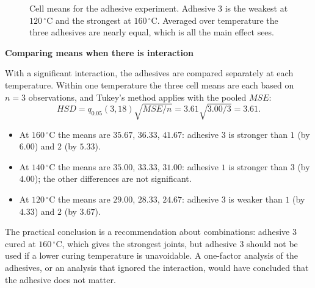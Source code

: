 \documentclass[11pt,a4paper]{article}
\numberwithin{equation}{section}
\theoremstyle{definition}
\newcommand{\subhead}[1]{%
  \par\medskip\noindent\textbf{#1}\par\nobreak\smallskip}
\begin{document}
\begin{figure}[H]
\centering
{}
\caption{Cell means for the adhesive experiment. Adhesive $3$ is the weakest at $120\,^\circ$C and the strongest at $160\,^\circ$C. Averaged over
temperature the three adhesives are nearly equal, which is all the main effect sees.}
\label{fig:adhesive}
\end{figure}

\subhead{Comparing means when there is interaction}
With a significant interaction, the adhesives are compared separately at each temperature. Within one temperature the three cell means are each
based on $n = 3$ observations, and Tukey's method applies with the pooled $MSE$:
\[
HSD = q_{0.05}(3, 18)\sqrt{MSE/n} = 3.61\sqrt{3.00/3} = 3.61 .
\]
\begin{itemize}
\item At $160\,^\circ$C the means are $35.67$, $36.33$, $41.67$: adhesive $3$ is stronger than $1$ (by $6.00$) and $2$ (by $5.33$).
\item At $140\,^\circ$C the means are $35.00$, $33.33$, $31.00$: adhesive $1$ is stronger than $3$ (by $4.00$); the other differences are not significant.
\item At $120\,^\circ$C the means are $29.00$, $28.33$, $24.67$: adhesive $3$ is weaker than $1$ (by $4.33$) and $2$ (by $3.67$).
\end{itemize}
The practical conclusion is a recommendation about combinations: adhesive $3$ cured at $160\,^\circ$C, which gives the strongest joints, but adhesive $3$ should not
be used if a lower curing temperature is unavoidable. A one-factor analysis of the adhesives, or an analysis that ignored the interaction, would
have concluded that the adhesive does not matter.
\end{document}
